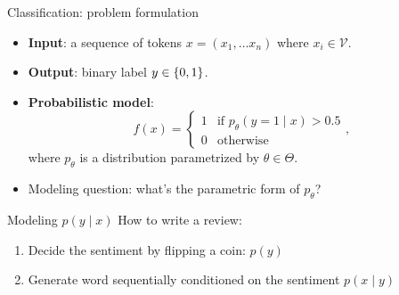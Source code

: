 \documentclass[usenames,dvipsnames,notes,11pt,aspectratio=169]{beamer}
\newcommand{\pdfnote}[1]{}
\begin{document}
\begin{frame}
    {Classification: problem formulation}
    \begin{itemize}
        \itemsep1em
        \item \textbf{Input}: a sequence of tokens $x=(x_1, \ldots x_n)$ where $x_i \in \mathcal{V}$.
            \pdfnote{After tokenization, our input is no longer a seq of bytes, but a seq of tokens.}
        \item \textbf{Output}: binary label $y\in \left\{ 0, 1 \right\}$.
        \item \textbf{Probabilistic model}:
            $$
            f(x) = \begin{cases}
 1 & \text{if $p_\theta(y=1\mid x) > 0.5$} \\
 0 & \text{otherwise}
 \end{cases} ,
            $$
            where $p_\theta$ is a distribution parametrized by $\theta\in{\Theta}$.
        \item Modeling question: what's the parametric form of $p_\theta$?
    \end{itemize}
    \pdfnote{
        Choosing $p_\theta$ is the modeling part where our task-specific knowledge comes in: how should the label depend on the text.
    }
\end{frame}

\begin{frame}
    {Modeling $p(y\mid x)$}
    How to write a review:\\
    \pdfnote{A useful starting place for modeling is to gain some intuition on how the task is performed by humans, and then tranform that into mathematical language.}
    \begin{enumerate}
        \item Decide the sentiment by flipping a coin: $p(y)$
        \item Generate word sequentially conditioned on the sentiment  $p(x\mid y)$
    \end{enumerate}
    \pause
    \vspace{-1ex}
    \vspace{-1ex}
\end{frame}
\end{document}
